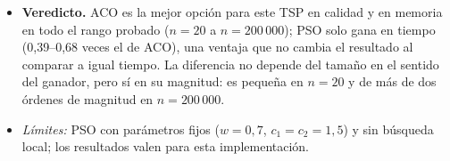 \begin{itemize}
\item \textbf{Veredicto.} ACO es la mejor opción para este TSP en calidad y en memoria en todo el rango probado ($n=20$ a $n=200\,000$); PSO solo gana en tiempo (0,39--0,68 veces el de ACO), una ventaja que no cambia el resultado al comparar a igual tiempo. La diferencia no depende del tamaño en el sentido del ganador, pero sí en su magnitud: es pequeña en $n=20$ y de más de dos órdenes de magnitud en $n=200\,000$.
\item \emph{Límites:} PSO con parámetros fijos ($w=0{,}7$, $c_1=c_2=1{,}5$) y sin búsqueda local; los resultados valen para esta implementación.
\end{itemize}
